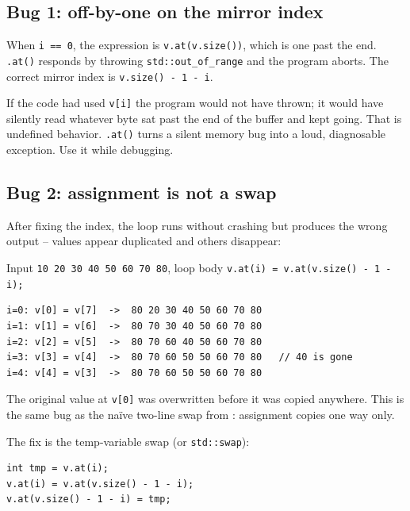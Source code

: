 \documentclass[11pt]{article}
\begin{document}
\subsection{Bug 1: off-by-one on the mirror index}

\begin{warnbox}
When \texttt{i == 0}, the expression is \texttt{v.at(v.size())}, which is
one past the end. \texttt{.at()} responds by throwing
\texttt{std::out\_of\_range} and the program aborts. The correct mirror
index is \texttt{v.size() - 1 - i}.
\end{warnbox}

\begin{notebox}
If the code had used \texttt{v[i]} the program would not have thrown; it
would have silently read whatever byte sat past the end of the buffer
and kept going. That is undefined behavior. \texttt{.at()} turns a silent
memory bug into a loud, diagnosable exception. Use it while debugging.
\end{notebox}

\subsection{Bug 2: assignment is not a swap}

After fixing the index, the loop runs without crashing but produces the
wrong output -- values appear duplicated and others disappear:

\begin{examplebox}
Input \texttt{10 20 30 40 50 60 70 80}, loop body
\texttt{v.at(i) = v.at(v.size() - 1 - i);}
\begin{verbatim}
i=0: v[0] = v[7]  ->  80 20 30 40 50 60 70 80
i=1: v[1] = v[6]  ->  80 70 30 40 50 60 70 80
i=2: v[2] = v[5]  ->  80 70 60 40 50 60 70 80
i=3: v[3] = v[4]  ->  80 70 60 50 50 60 70 80   // 40 is gone
i=4: v[4] = v[3]  ->  80 70 60 50 50 60 70 80
\end{verbatim}
The original value at \texttt{v[0]} was overwritten before it was
copied anywhere. This is the same bug as the na\"ive two-line swap from
: assignment copies one way only.
\end{examplebox}

The fix is the temp-variable swap (or \texttt{std::swap}):

\begin{verbatim}
int tmp = v.at(i);
v.at(i) = v.at(v.size() - 1 - i);
v.at(v.size() - 1 - i) = tmp;
\end{verbatim}
\end{document}
